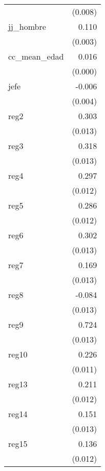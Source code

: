 {\begin{longtable}{l*{1}{D{.}{.}{-1}}}
            &     (0.008)         \\
\addlinespace
jj\_hombre   &       0.110\sym{***}\\
            &     (0.003)         \\
\addlinespace
cc\_mean\_edad&       0.016\sym{***}\\
            &     (0.000)         \\
\addlinespace
jefe        &      -0.006         \\
            &     (0.004)         \\
\addlinespace
reg2        &       0.303\sym{***}\\
            &     (0.013)         \\
\addlinespace
reg3        &       0.318\sym{***}\\
            &     (0.013)         \\
\addlinespace
reg4        &       0.297\sym{***}\\
            &     (0.012)         \\
\addlinespace
reg5        &       0.286\sym{***}\\
            &     (0.012)         \\
\addlinespace
reg6        &       0.302\sym{***}\\
            &     (0.013)         \\
\addlinespace
reg7        &       0.169\sym{***}\\
            &     (0.013)         \\
\addlinespace
reg8        &      -0.084\sym{***}\\
            &     (0.013)         \\
\addlinespace
reg9        &       0.724\sym{***}\\
            &     (0.013)         \\
\addlinespace
reg10       &       0.226\sym{***}\\
            &     (0.011)         \\
\addlinespace
reg13       &       0.211\sym{***}\\
            &     (0.012)         \\
\addlinespace
reg14       &       0.151\sym{***}\\
            &     (0.013)         \\
\addlinespace
reg15       &       0.136\sym{***}\\
            &     (0.012)         \\

\end{longtable}}
